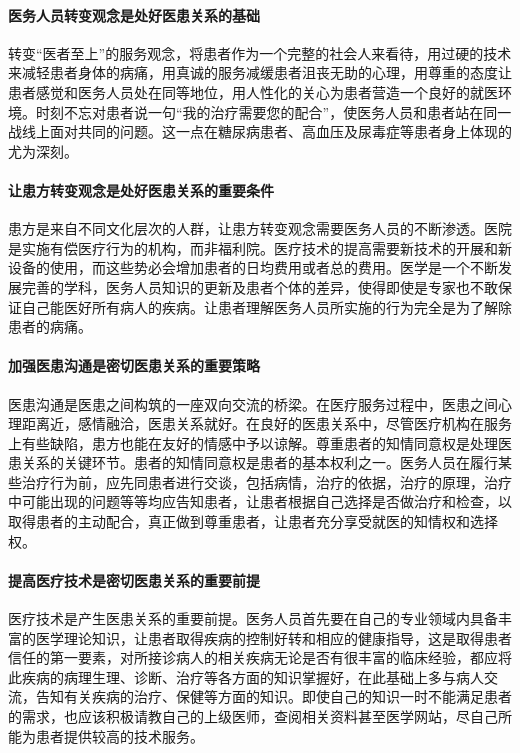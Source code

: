 \documentclass[11pt,twoside,a4paper]{article}
\begin{document}
		\paragraph{医务人员转变观念是处好医患关系的基础}
		转变“医者至上”的服务观念，将患者作为一个完整的社会人来看待，用过硬的技术来减轻患者身体的病痛，用真诚的服务减缓患者沮丧无助的心理，用尊重的态度让患者感觉和医务人员处在同等地位，用人性化的关心为患者营造一个良好的就医环境。时刻不忘对患者说一句“我的治疗需要您的配合”，使医务人员和患者站在同一战线上面对共同的问题。这一点在糖尿病患者、高血压及尿毒症等患者身上体现的尤为深刻。 
		\paragraph{让患方转变观念是处好医患关系的重要条件} 
		患方是来自不同文化层次的人群，让患方转变观念需要医务人员的不断渗透。医院是实施有偿医疗行为的机构，而非福利院。医疗技术的提高需要新技术的开展和新设备的使用，而这些势必会增加患者的日均费用或者总的费用。医学是一个不断发展完善的学科，医务人员知识的更新及患者个体的差异，使得即使是专家也不敢保证自己能医好所有病人的疾病。让患者理解医务人员所实施的行为完全是为了解除患者的病痛。 
		
		\paragraph{加强医患沟通是密切医患关系的重要策略 }
		医患沟通是医患之间构筑的一座双向交流的桥梁。在医疗服务过程中，医患之间心理距离近，感情融洽，医患关系就好。在良好的医患关系中，尽管医疗机构在服务上有些缺陷，患方也能在友好的情感中予以谅解。尊重患者的知情同意权是处理医患关系的关键环节。患者的知情同意权是患者的基本权利之一。医务人员在履行某些治疗行为前，应先同患者进行交谈，包括病情，治疗的依据，治疗的原理，治疗中可能出现的问题等等均应告知患者，让患者根据自己选择是否做治疗和检查，以取得患者的主动配合，真正做到尊重患者，让患者充分享受就医的知情权和选择权。 
		
		\paragraph{提高医疗技术是密切医患关系的重要前提}
		 
		医疗技术是产生医患关系的重要前提。医务人员首先要在自己的专业领域内具备丰富的医学理论知识，让患者取得疾病的控制好转和相应的健康指导，这是取得患者信任的第一要素，对所接诊病人的相关疾病无论是否有很丰富的临床经验，都应将此疾病的病理生理、诊断、治疗等各方面的知识掌握好，在此基础上多与病人交流，告知有关疾病的治疗、保健等方面的知识。即使自己的知识一时不能满足患者的需求，也应该积极请教自己的上级医师，查阅相关资料甚至医学网站，尽自己所能为患者提供较高的技术服务。 
\end{document}
